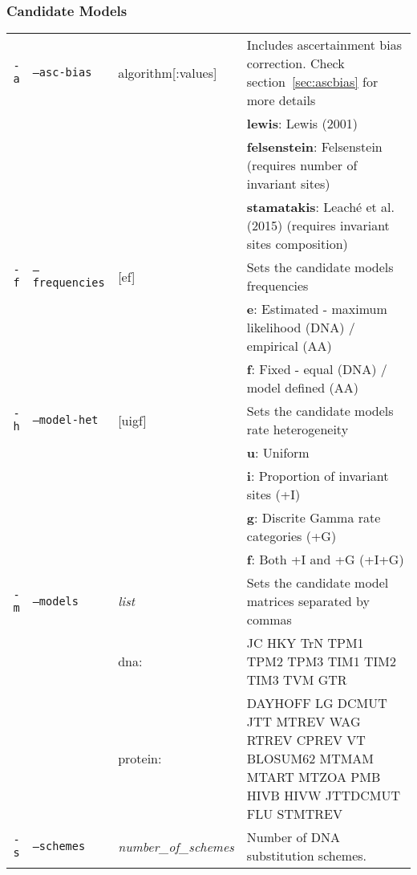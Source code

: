 \subsubsection{Candidate Models}

  \begin{tabular}{rllp{}}
    \hline
    \texttt{-a} & \texttt{--asc-bias} & algorithm[:values] & Includes ascertainment bias correction. Check section~\ref{sec:ascbias} for more details \\
                                     &&&  {\bf lewis}: Lewis (2001) \\
                                     &&&  {\bf felsenstein}: Felsenstein (requires number of invariant sites) \\
                                     &&&  {\bf stamatakis}: Leaché et al. (2015) (requires invariant sites composition) \\
     \texttt{-f} & \texttt{--frequencies} & [ef]           & Sets the candidate models frequencies \\
                                     &&& {\bf e}: Estimated - maximum likelihood (DNA) / empirical (AA) \\
                                     &&& {\bf f}: Fixed - equal (DNA) / model defined (AA) \\
     \texttt{-h} & \texttt{--model-het} & [uigf] & Sets the candidate models rate heterogeneity \\
                                     &&& {\bf u}: Uniform \\
                                     &&& {\bf i}: Proportion of invariant sites (+I) \\
                                     &&& {\bf g}: Discrite Gamma rate categories (+G) \\
                                     &&& {\bf f}: Both +I and +G (+I+G) \\
     \texttt{-m} & \texttt{--models}  & {\em list} & Sets the candidate model matrices separated by commas \\
                                      && dna: & JC HKY TrN TPM1 TPM2 TPM3 TIM1 TIM2 TIM3 TVM GTR \\
                                      && protein: & DAYHOFF LG DCMUT JTT MTREV WAG RTREV CPREV VT BLOSUM62 MTMAM MTART MTZOA PMB HIVB HIVW JTTDCMUT FLU STMTREV \\
    \texttt{-s} & \texttt{--schemes}  & {\em number\_of\_schemes} & Number of DNA substitution schemes. \\

\end{tabular}
